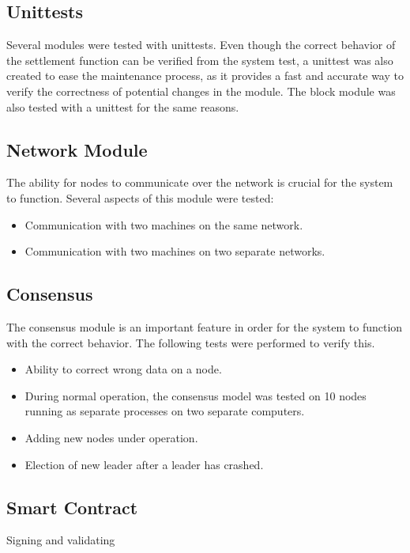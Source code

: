 \subsection{Unittests}
Several modules were tested with unittests. Even though the correct behavior of the settlement function can be verified from the system test, a unittest was also created to ease the maintenance process, as it provides a fast and accurate way to verify the correctness of potential changes in the module. The block module was also tested with a unittest for the same reasons.

\subsection{Network Module}
The ability for nodes to communicate over the network is crucial for the system to function. Several aspects of this module were tested:
\begin{itemize}
\item Communication with two machines on the same network.
\item Communication with two machines on two separate networks.
\end{itemize}

\subsection{Consensus}
The consensus module is an important feature in order for the system to function with the correct behavior. The following tests were performed to verify this.
\begin{itemize}
\item Ability to correct wrong data on a node.
\item During normal operation, the consensus model was tested on 10 nodes running as separate processes on two separate computers.
\item Adding new nodes under operation.
\item Election of new leader after a leader has crashed.
\end{itemize}

\subsection{Smart Contract}
Signing and validating 



